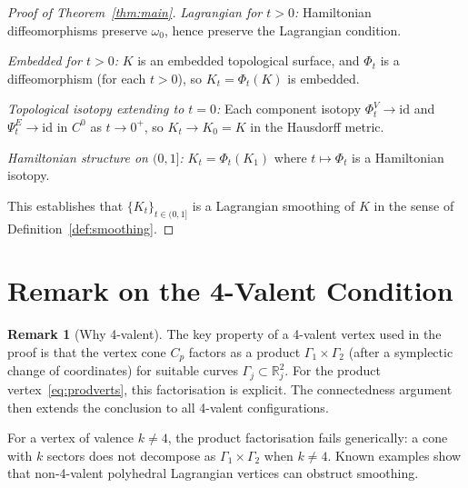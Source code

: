 \documentclass[12pt]{article}
\theoremstyle{definition}
\newtheorem{remark}[theorem]{Remark}
\newcommand{\R}{\mathbb{R}}
\newcommand{\om}{\omega}
\begin{document}
\begin{proof}[Proof of Theorem~\ref{thm:main}]
\emph{Lagrangian for $t>0$:} Hamiltonian diffeomorphisms preserve
$\om_0$, hence preserve the Lagrangian condition.

\emph{Embedded for $t>0$:} $K$ is an embedded topological surface, and
$\Phi_t$ is a diffeomorphism (for each $t>0$), so $K_t=\Phi_t(K)$ is
embedded.

\emph{Topological isotopy extending to $t=0$:}
Each component isotopy $\Phi^V_t\to\mathrm{id}$ and $\Psi^E_t\to\mathrm{id}$
in $C^0$ as $t\to0^+$, so $K_t\to K_0=K$ in the Hausdorff metric.

\emph{Hamiltonian structure on $(0,1]$:}
$K_t=\Phi_t(K_1)$ where $t\mapsto\Phi_t$ is a Hamiltonian isotopy.

This establishes that $\{K_t\}_{t\in(0,1]}$ is a Lagrangian smoothing
of $K$ in the sense of Definition~\ref{def:smoothing}.
\end{proof}

\section{Remark on the 4-Valent Condition}\label{sec:remark}

\begin{remark}[Why 4-valent]\label{rem:why4}
The key property of a 4-valent vertex used in the proof is that the
vertex cone $C_p$ factors as a product $\Gamma_1\times\Gamma_2$
(after a symplectic change of coordinates) for suitable curves
$\Gamma_j\subset\R^2_j$.  For the product vertex~\eqref{eq:prodverts},
this factorisation is explicit.  The connectedness argument then extends
the conclusion to all 4-valent configurations.

For a vertex of valence $k\ne4$, the product factorisation fails
generically: a cone with $k$ sectors does not decompose as
$\Gamma_1\times\Gamma_2$ when $k\ne4$.  Known examples show that
non-4-valent polyhedral Lagrangian vertices can obstruct smoothing.
\end{remark}
\end{document}
